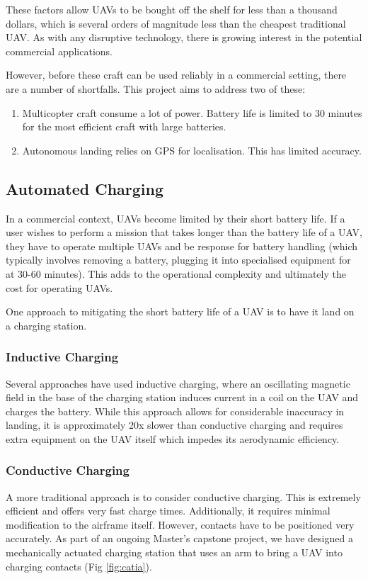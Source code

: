 \documentclass[10pt]{scrartcl} %
\begin{document}
These factors allow UAVs to be bought off the shelf for less than a thousand dollars, which is several orders of magnitude less than the cheapest traditional UAV. As with any disruptive technology, there is growing interest in the potential commercial applications. 

However, before these craft can be used reliably in a commercial setting, there are a number of shortfalls. This project aims to address two of these:
\begin{enumerate}
\item{Multicopter craft consume a lot of power. Battery life is limited to 30 minutes for the most efficient craft with large batteries.}
\item{Autonomous landing relies on GPS for localisation. This has limited accuracy.}
\end{enumerate}

\subsection{Automated Charging}

In a commercial context, UAVs become limited by their short battery life. If a user wishes to perform a mission that takes longer than the battery life of a UAV, they have to operate multiple UAVs and be response for battery handling (which typically involves removing a battery, plugging it into specialised equipment for at 30-60 minutes). This adds to the operational complexity and ultimately the cost for operating UAVs.

One approach to mitigating the short battery life of a UAV is to have it land on a charging station. 

\subsubsection{Inductive Charging}
Several approaches have used inductive charging, where an oscillating magnetic field in the base of the charging station induces current in a coil on the UAV and charges the battery. While this approach allows for considerable inaccuracy in landing, it is approximately 20x slower than conductive charging and requires extra equipment on the UAV itself which impedes its aerodynamic efficiency.

\subsubsection{Conductive Charging}
A more traditional approach is to consider conductive charging. This is extremely efficient and offers very fast charge times. Additionally, it requires minimal modification to the airframe itself. However, contacts have to be positioned very accurately. As part of an ongoing Master's capstone project, we have designed a mechanically actuated charging station that uses an arm to bring a UAV into charging contacts (Fig \ref{fig:catia}). 
\end{document}
